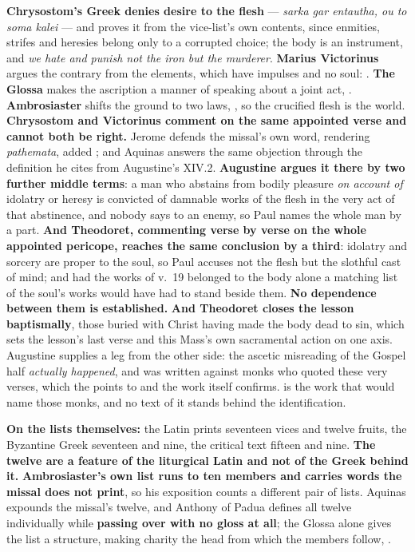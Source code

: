 \textbf{Chrysostom's Greek denies desire to the flesh} --- \emph{sarka
gar entautha, ou to soma kalei} --- and proves it from the vice-list's own
contents, since enmities, strifes and heresies belong only to a corrupted
choice; the body is an instrument, and \emph{we hate and punish not the iron but
the murderer}. \textbf{Marius Victorinus} argues the contrary from the elements,
which have impulses and no soul: . \textbf{The Glossa} makes the ascription a manner of speaking about a
joint act, . \textbf{Ambrosiaster} shifts the ground
to two laws, , so the crucified flesh is the
world. \textbf{Chrysostom and Victorinus comment on the same appointed verse and
cannot both be right.} Jerome defends the missal's own word, 
rendering \emph{pathemata},  added ; and Aquinas
answers the same objection through the definition he cites from Augustine's
 XIV.2. \textbf{Augustine argues it there by two further
middle terms}: a man who abstains from bodily pleasure \emph{on account of}
idolatry or heresy is convicted of damnable works of the flesh in the very act
of that abstinence, and nobody says  to an enemy, so Paul
names the whole man by a part. \textbf{And Theodoret, commenting verse by verse
on the whole appointed pericope, reaches the same conclusion by a third}:
idolatry and sorcery are proper to the soul, so Paul accuses not the flesh but
the slothful cast of mind; and had the works of v.~19 belonged to the body alone
a matching list of the soul's works would have had to stand beside them.
\textbf{No dependence between them is established.} \textbf{And Theodoret
closes the lesson baptismally}, those buried with Christ having made the body
dead to sin, which sets the lesson's last verse and this Mass's own sacramental
action on one axis. Augustine supplies a leg from the other side: the ascetic
misreading of the Gospel half \emph{actually happened}, and  was written against monks who quoted these very verses, which the
 points to and the work itself confirms.  is the work that would
name those monks, and no text of it stands behind the identification.

\textbf{On the lists themselves:} the Latin prints seventeen vices and twelve
fruits, the Byzantine Greek seventeen and nine, the critical text
fifteen and nine. \textbf{The twelve are a feature of the liturgical
Latin and not of the Greek behind it.} \textbf{Ambrosiaster's own list runs to
ten members and carries words the missal does not print}, so his exposition
counts a different pair of lists. Aquinas expounds the
missal's twelve, and Anthony of Padua defines all twelve individually while
\textbf{passing over  with no gloss at all}; the Glossa alone
gives the list a structure, making charity the head from which the members
follow, .

